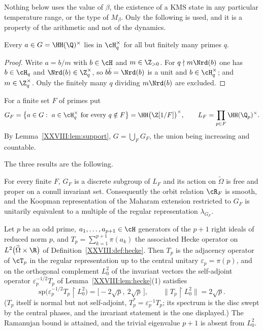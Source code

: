Nothing below uses the value of $\beta$, the existence of a $\mathrm{KMS}$ state in any particular
temperature range, or the type of $M_\beta$. Only the following is used, and it is a property of
the arithmetic and not of the dynamics.

\begin{lemma}\label{XXVIII:lem:support}
Every $a\in G=\HH(\Q)^\times$ lies in $\cH_q^\times$ for all but finitely many primes $q$.
\end{lemma}

\begin{proof}
Write $a=b/m$ with $b\in\cH$ and $m\in\Z_{>0}$. For $q\nmid m\Nrd(b)$ one has $b\in\cH_q$ and
$\Nrd(b)\in\Z_q^\times$, so $b\bar b=\Nrd(b)$ is a unit and $b\in\cH_q^\times$; and
$m\in\Z_q^\times$. Only the finitely many $q$ dividing $m\Nrd(b)$ are excluded.
\end{proof}

For a finite set $F$ of primes put
\[
G_F=\bigl\{a\in G:\ a\in\cH_q^\times\ \text{for every } q\notin F\bigr\}=\HH\bigl(\Z[1/F]\bigr)^\times,
\qquad L_F=\prod_{p\in F}\HH(\Q_p)^\times .
\]
By Lemma~\ref{XXVIII:lem:support}, $G=\bigcup_FG_F$, the union being increasing and countable.

\medskip
The three results are the following.

\begin{theorem}\label{XXVIII:thm:proper}
For every finite $F$, $G_F$ is a discrete subgroup of $L_F$ and its action on $\widetilde\Omega$
is free and proper on a conull invariant set. Consequently the orbit relation $\cR_F$ is smooth,
and the Koopman representation of the Maharam extension restricted to $G_F$ is unitarily
equivalent to a multiple of the regular representation $\lambda_{G_F}$.
\end{theorem}

\begin{theorem}\label{XXVIII:thm:spec}
Let $p$ be an odd prime, $a_1,\dots,a_{p+1}\in\cH$ generators of the $p+1$ right ideals of reduced
norm $p$, and $T_p=\sum_{k=1}^{p+1}\pi(a_k)$ the associated Hecke operator on
$L^2\bigl(\widetilde\Omega\times\R\bigr)$ of Definition~\ref{XXVIII:def:hecke}. Then $T_p$ is the
adjacency operator of $\cT_p$ in the regular representation up to the central unitary
$\varepsilon_p=\pi(p)$, and on the orthogonal complement
$L^2_0$ of the invariant vectors the self-adjoint operator $\varepsilon_p^{-1/2}T_p$ of
Lemma~\ref{XXVIII:lem:hecke}(1) satisfies
\[
\mathrm{sp}\bigl(\varepsilon_p^{-1/2}T_p\restriction L^2_0\bigr)=\bigl[-2\sqrt p,\ 2\sqrt p\,\bigr],
\qquad \bigl\|T_p\restriction L^2_0\bigr\|=2\sqrt p .
\]
($T_p$ itself is normal but not self-adjoint, $T_p^*=\varepsilon_p^{-1}T_p$; its spectrum is
the disc swept by the central phases, and the invariant statement is the one displayed.)
The Ramanujan bound is attained, and the trivial eigenvalue $p+1$ is absent from $L^2_0$.
\end{theorem}

